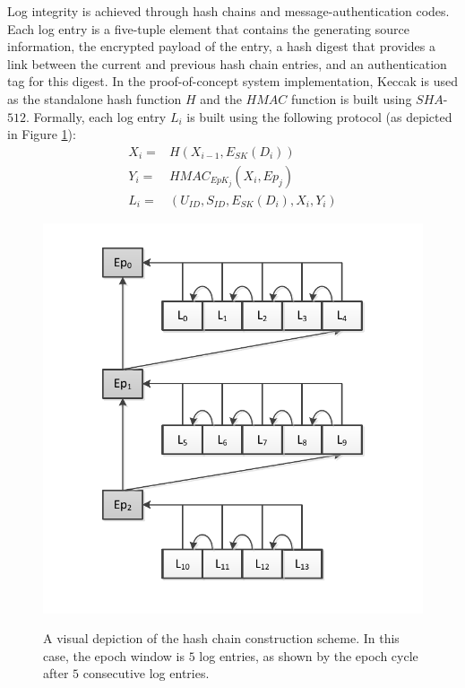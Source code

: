 \documentclass{sig-alternate}
\begin{document}
Log integrity is achieved through hash chains and message-authentication codes. 
Each log entry is a five-tuple element that contains the generating source
information, the encrypted payload of the entry, a hash digest that provides
a link between the current and previous hash chain entries, and an authentication tag for this digest. In the proof-of-concept
system implementation, Keccak is used as the standalone hash function $H$
and the $HMAC$ function is built using $SHA$-$512$. 
Formally, each log entry $L_i$ is built using the following protocol (as depicted in Figure \ref{fig:hashChain}):
\begin{align*}
X_i = & H(X_{i - 1}, E_{SK}(D_i)) \\ %
Y_i = & HMAC_{EpK_{j}}(X_i, Ep_{j}) \\ %
L_i = & (U_{ID}, S_{ID}, E_{SK}(D_i), X_i, Y_i) %
\end{align*}

\begin{figure}[ht!]
  \centering
  \includegraphics[scale=0.8]{images/hashchain.pdf} \\
\caption{A visual depiction of the hash chain construction scheme. In this case, the epoch window is $5$ log entries, as shown by the epoch
cycle after $5$ consecutive log entries.}
\label{fig:hashChain}
\end{figure}
\end{document}
